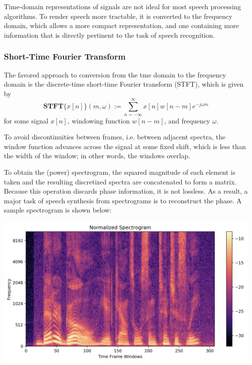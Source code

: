 Time-domain representations of signals are not ideal for most speech processing 
algorithms. To render speech more tractable, it is converted to the frequency domain, 
which allows a more compact representation, and one containing more information that 
is directly pertinent to the task of speech recognition.

\subsubsection{Short-Time Fourier Transform}

The favored approach to conversion from the tme domain to the frequency domain is the 
discrete-time short-time Fourier transform (STFT), which is given by 
$$\textbf{STFT}\{ x[n] \}( m, \omega ) := %
\sum\limits_{n=-\infty}^{\infty} x[n] w[n-m] e^{-j \omega m}$$
for some signal $x[n]$, windowing function $w[n-m]$, and frequency $\omega$.

To avoid discontinuities between frames, i.e. between adjacent spectra, the window 
function advances across the signal at some fixed shift, which is less than the 
width of the window; in other words, the windows overlap. 

To obtain the (power) spectrogram, the squared magnitude of each element is taken 
and the resulting discretized spectra are concatenated to form a matrix. 
Because this operation discards phase information, it is not lossless. As a result, 
a major task of speech synthesis from spectrograms is to reconstruct the phase.
A sample spectrogram is shown below:

\includegraphics[width=\textwidth]{img/img_spectrogram.png}



